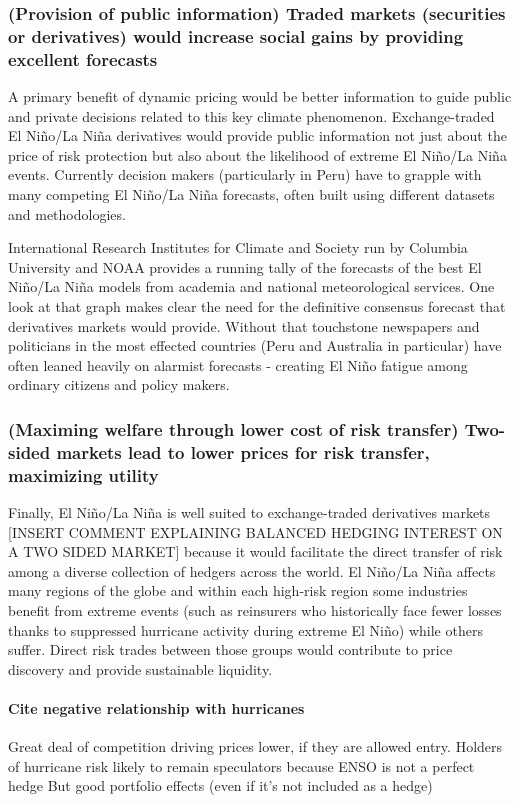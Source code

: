 \documentclass[authoryear]{article}
\begin{document}
\subsubsection{(Provision of public information) Traded markets (securities or derivatives) would increase social gains by providing excellent forecasts} 

A primary benefit of dynamic pricing would be better information to guide public and private decisions related to this key climate phenomenon. Exchange-traded El Ni\~no/La Ni\~na derivatives would provide public information not just about the price of risk protection but also about the likelihood of extreme El Ni\~no/La Ni\~na events. Currently decision makers (particularly in Peru) have to grapple with many competing El Ni\~no/La Ni\~na forecasts, often built using different datasets and methodologies. 

International Research Institutes for Climate and Society run by Columbia University and NOAA provides a running tally of the forecasts of the best El Ni\~no/La Ni\~na models from academia and national meteorological services. One look at that graph makes clear the need for the definitive consensus forecast that derivatives markets would provide. Without that touchstone newspapers and politicians in the most effected countries (Peru and Australia in particular) have often leaned heavily on alarmist forecasts - creating El Ni\~no fatigue among ordinary citizens and policy makers.

\subsubsection{(Maximing welfare through lower cost of risk transfer) Two-sided markets lead to lower prices for risk transfer, maximizing utility}
Finally, El Ni\~no/La Ni\~na is well suited to exchange-traded derivatives markets [INSERT COMMENT EXPLAINING BALANCED HEDGING INTEREST ON A TWO SIDED MARKET] because it would facilitate the direct transfer of risk among a diverse collection of hedgers across the world. El Ni\~no/La Ni\~na affects many regions of the globe and within each high-risk region some industries benefit from extreme events (such as reinsurers who historically face fewer losses thanks to suppressed hurricane activity during extreme El Ni\~no) while others suffer. Direct risk trades between those groups would contribute to price discovery and provide sustainable liquidity.

\paragraph{Cite negative relationship with hurricanes}
Great deal of competition driving prices lower, if they are allowed entry.
Holders of hurricane risk likely to remain speculators because ENSO is not a perfect hedge 
But good portfolio effects (even if it's not included as a hedge)
\end{document}
